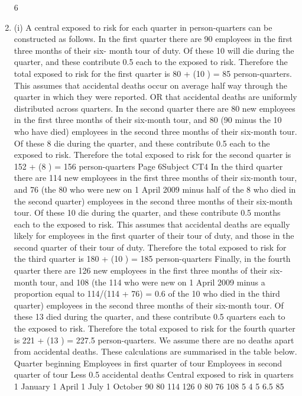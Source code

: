 \documentclass[a4paper,12pt]{article}
\begin{document}
\begin{enumerate}
6
\item (i)
A central exposed to risk for each quarter in person-quarters can be constructed as follows.
In the first quarter there are 90 employees in the first three months of their six-
month tour of duty. Of these 10 will die during the quarter, and these contribute 0.5 each to the exposed to risk.
Therefore the total exposed to risk for the first quarter is 80 + (10 ) = 85 person-quarters.
This assumes that accidental deaths occur on average half way through the quarter in which they were reported. OR that accidental
deaths are uniformly distributed across quarters. In the second quarter there are 80 new employees in the first three months of
their six-month tour, and 80 (90 minus the 10 who have died) employees in the second three months of their six-month tour. Of these 8 die during the quarter, and these contribute 0.5 each to the exposed to risk.
Therefore the total exposed to risk for the second quarter
is 152 + (8 ) = 156 person-quarters
Page 6Subject CT4 %
In the third quarter there are 114 new employees in the first three months of
their six-month tour, and 76 (the 80 who were new on 1 April 2009 minus half of the 8 who died in the second quarter) employees in the second three months of their six-month tour. Of these 10 die during the quarter, and these
contribute 0.5 months each to the exposed to risk.
This assumes that accidental deaths are equally likely for employees
in the first quarter of their tour of duty, and those in the second quarter
of their tour of duty.
Therefore the total exposed to risk for the third quarter
is 180 + (10 ) = 185 person-quarters
Finally, in the fourth quarter there are 126 new employees in the first three
months of their six-month tour, and 108 (the 114 who were new on 1 April
2009 minus a proportion equal to 114/(114 + 76) = 0.6 of the 10 who died in
the third quarter) employees in the second three months of their six-month
tour.
Of these 13 died during the quarter, and these contribute
0.5 quarters each to the exposed to risk.
Therefore the total exposed to risk for the fourth quarter is
221 + (13 ) = 227.5 person-quarters.
We assume there are no deaths apart from accidental deaths.
These calculations are summarised in the table below.
Quarter
beginning Employees in
first quarter
of tour Employees in
second quarter
of tour Less 0.5 \times
accidental
deaths Central
exposed
to risk in
quarters
1 January
1 April
1 July
1 October 90
80
114
126 0
80
76
108 5
4
5
6.5 85

\end{enumerate}
\end{document}
